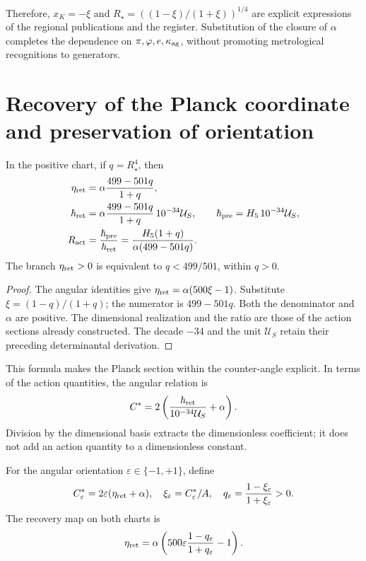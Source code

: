 Therefore, \(x_K=-\xi\) and \(R_\star=((1-\xi)/(1+\xi))^{1/4}\) are explicit expressions of the regional publications and the register. Substitution of the closure of \(\alpha\) completes the dependence on \(\pi,\varphi,e,\kappa_{\rm ag}\), without promoting metrological recognitions to generators.

\section{Recovery of the Planck coordinate and preservation of orientation}

\begin{theorem}
\label{x_reciprocidad:rec:thm:accion}
In the positive chart, if \(q=R_\star^4\), then
\begin{align}
 \eta_{\rm ret}&=\alpha\frac{499-501q}{1+q},\label{x_reciprocidad:rec:eq:eta-radio}\\
 \hbar_{\rm ret}&=\alpha\frac{499-501q}{1+q}\,10^{-34}\mathcal U_S,
 \qquad\hbar_{\rm pre}=H_5\,10^{-34}\mathcal U_S,\label{x_reciprocidad:rec:eq:planck-radio}\\
 R_{\rm act}&=\frac{\hbar_{\rm pre}}{\hbar_{\rm ret}}
 =\frac{H_5(1+q)}{\alpha(499-501q)}.\label{x_reciprocidad:rec:eq:ratio-radio}
\end{align}
The branch \(\eta_{\rm ret}>0\) is equivalent to \(q<499/501\), within \(q>0\).
\end{theorem}
\begin{proof}
The angular identities give \(\eta_{\rm ret}=\alpha(500\xi-1)\). Substitute \(\xi=(1-q)/(1+q)\); the numerator is \(499-501q\). Both the denominator and \(\alpha\) are positive. The dimensional realization and the ratio are those of the action sections already constructed. The decade \(-34\) and the unit \(\mathcal U_S\) retain their preceding determinantal derivation.
\end{proof}

This formula makes the Planck section within the counter-angle explicit. In terms of the action quantities, the angular relation is
\[
 C^*=2\left(\frac{\hbar_{\rm ret}}{10^{-34}\mathcal U_S}+\alpha\right).
\]
Division by the dimensional basis extracts the dimensionless coefficient; it does not add an action quantity to a dimensionless constant.

For the angular orientation \(\varepsilon\in\{-1,+1\}\), define
\[
 C^*_{\varepsilon}=2\varepsilon(\eta_{\rm ret}+\alpha),\quad
 \xi_\varepsilon=C^*_{\varepsilon}/A,\quad
 q_\varepsilon=\frac{1-\xi_\varepsilon}{1+\xi_\varepsilon}>0.
\]
The recovery map on both charts is
\begin{equation}
 \eta_{\rm ret}=\alpha\left(500\varepsilon
        \frac{1-q_\varepsilon}{1+q_\varepsilon}-1\right).
 \label{x_reciprocidad:rec:eq:eta-orientada}
\end{equation}

